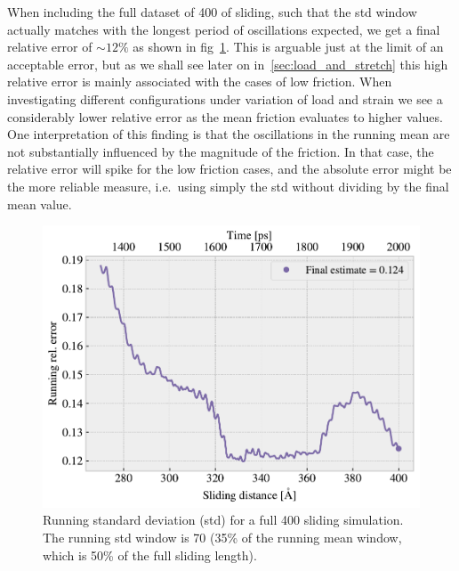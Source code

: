 When including the full dataset of \SI{400}{} of sliding, such that the \acrshort{std} window actually matches with the longest period of oscillations expected, we get a final relative error of $\sim 12 \%$ as shown in fig~\cref{fig:runstd_long}. This is arguable just at the limit of an acceptable error, but as we shall see later on in~\cref{sec:load_and_stretch} this high relative error is mainly associated with the cases of low friction. When investigating different configurations under variation of load and strain we see a considerably lower relative error as the mean friction evaluates to higher values. One interpretation of this finding is that the oscillations in the running mean are not substantially influenced by the magnitude of the friction. In that case, the relative error will spike for the low friction cases, and the absolute error might be the more reliable measure, i.e.\ using simply the \acrshort{std} without dividing by the final mean value.


\begin{figure}[!htb]
  \centering
  \includegraphics[width=0.5\linewidth]{figures/baseline/Ff_runstd_long.pdf}
  \caption{Running standard deviation (std) for a full \SI{400}{{}} sliding simulation. The running std window is \SI{70}{} (35\% of the running mean window, which is 50\% of the full sliding length).}
  \label{fig:runstd_long}
\end{figure}


